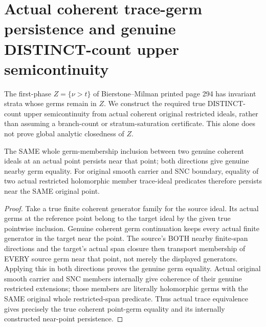 \section{Actual coherent trace-germ persistence and genuine DISTINCT-count upper semicontinuity}

The first-phase $Z=\{\nu>t\}$ of Bierstone--Milman printed page 294 has
invariant strata whose germs remain in $Z$. We construct the required true
DISTINCT-count upper semicontinuity from actual coherent original restricted
ideals, rather than assuming a branch-count or stratum-saturation certificate.
This alone does not prove global analytic closedness of $Z$.

\begin{lemma}
\label{hir:sharp-original-coherent-restricted-germ-equality-persistence}
\leanok
The SAME whole germ-membership inclusion between two genuine coherent ideals
at an actual point persists near that point; both directions give genuine
nearby germ equality. For original smooth carrier and SNC boundary, equality
of two actual restricted holomorphic member trace-ideal predicates therefore
persists near the SAME original point.
\end{lemma}
\begin{proof}
Take a true finite coherent generator family for the source ideal. Its actual
germs at the reference point belong to the target ideal by the given true
pointwise inclusion. Genuine coherent germ continuation keeps every actual
finite generator in the target near the point. The source's BOTH nearby
finite-span directions and the target's actual span closure then transport
membership of EVERY source germ near that point, not merely the displayed
generators. Applying this in both directions proves the genuine germ equality.
Actual original smooth carrier and SNC members internally give coherence of
their genuine restricted extensions; those members are literally holomorphic
germs with the SAME original whole restricted-span predicate. Thus actual
trace equivalence gives precisely the true coherent point-germ equality and
its internally constructed near-point persistence.
\end{proof}

